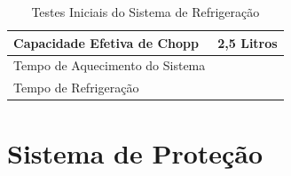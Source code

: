                         \begin{table}[H]
                            \centering
                            \caption{Testes Iniciais do Sistema de Refrigeração}
                            \label{testes-refrigeracao}
                            \begin{tabular}{|l|l|}
                                \hline
                                Capacidade Efetiva de Chopp & 2,5 Litros \\ \hline
                                Tempo de Aquecimento do Sistema &  \\ \hline
                                Tempo de Refrigeração &  \\ \hline
                            \end{tabular}
                        \end{table}
                        
    \section[Sistema de Proteção]{Sistema de Proteção}